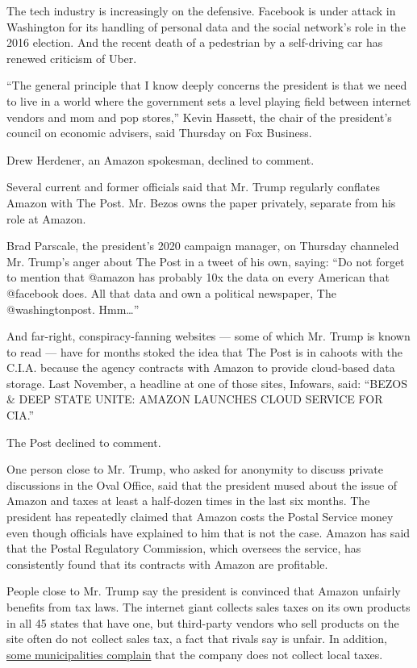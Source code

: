 The tech industry is increasingly on the defensive. Facebook is under
attack in Washington for its handling of personal data and the social
network's role in the 2016 election. And the recent death of a
pedestrian by a self-driving car has renewed criticism of Uber.

``The general principle that I know deeply concerns the president is
that we need to live in a world where the government sets a level
playing field between internet vendors and mom and pop stores,'' Kevin
Hassett, the chair of the president's council on economic advisers, said
Thursday on Fox Business.

Drew Herdener, an Amazon spokesman, declined to comment.

Several current and former officials said that Mr. Trump regularly
conflates Amazon with The Post. Mr. Bezos owns the paper privately,
separate from his role at Amazon.

Brad Parscale, the president's 2020 campaign manager, on Thursday
channeled Mr. Trump's anger about The Post in a tweet of his own,
saying: ``Do not forget to mention that @amazon has probably 10x the
data on every American that @facebook does. All that data and own a
political newspaper, The @washingtonpost. Hmm\ldots{}''

And far-right, conspiracy-fanning websites --- some of which Mr. Trump
is known to read --- have for months stoked the idea that The Post is in
cahoots with the C.I.A. because the agency contracts with Amazon to
provide cloud-based data storage. Last November, a headline at one of
those sites, Infowars, said: ``BEZOS \& DEEP STATE UNITE: AMAZON
LAUNCHES CLOUD SERVICE FOR CIA.''

The Post declined to comment.

One person close to Mr. Trump, who asked for anonymity to discuss
private discussions in the Oval Office, said that the president mused
about the issue of Amazon and taxes at least a half-dozen times in the
last six months. The president has repeatedly claimed that Amazon costs
the Postal Service money even though officials have explained to him
that is not the case. Amazon has said that the Postal Regulatory
Commission, which oversees the service, has consistently found that its
contracts with Amazon are profitable.

People close to Mr. Trump say the president is convinced that Amazon
unfairly benefits from tax laws. The internet giant collects sales taxes
on its own products in all 45 states that have one, but third-party
vendors who sell products on the site often do not collect sales tax, a
fact that rivals say is unfair. In addition,
\href{https://www.nytimes.com/2018/03/25/business/economy/amazon-tax.html}{some
municipalities complain} that the company does not collect local taxes.

